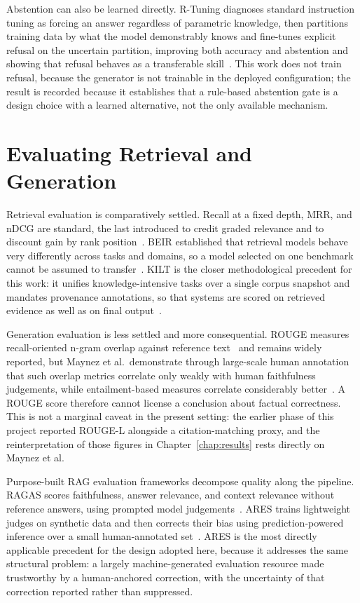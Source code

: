 Abstention can also be learned directly. R-Tuning diagnoses standard instruction tuning as forcing an answer regardless of parametric knowledge, then partitions training data by what the model demonstrably knows and fine-tunes explicit refusal on the uncertain partition, improving both accuracy and abstention and showing that refusal behaves as a transferable skill~\cite{zhang2024rtuning}. This work does not train refusal, because the generator is not trainable in the deployed configuration; the result is recorded because it establishes that a rule-based abstention gate is a design choice with a learned alternative, not the only available mechanism.

\section{Evaluating Retrieval and Generation}
\label{sec:sota-eval}

Retrieval evaluation is comparatively settled. Recall at a fixed depth, \ac{MRR}, and \ac{nDCG} are standard, the last introduced to credit graded relevance and to discount gain by rank position~\cite{jarvelin2002cumulated}. BEIR established that retrieval models behave very differently across tasks and domains, so a model selected on one benchmark cannot be assumed to transfer~\cite{thakur2021beir}. KILT is the closer methodological precedent for this work: it unifies knowledge-intensive tasks over a single corpus snapshot and mandates provenance annotations, so that systems are scored on retrieved evidence as well as on final output~\cite{petroni2021kilt}.

Generation evaluation is less settled and more consequential. ROUGE measures recall-oriented n-gram overlap against reference text~\cite{lin2004rouge} and remains widely reported, but Maynez et al.\ demonstrate through large-scale human annotation that such overlap metrics correlate only weakly with human faithfulness judgements, while entailment-based measures correlate considerably better~\cite{maynez2020faithfulness}. A ROUGE score therefore cannot license a conclusion about factual correctness. This is not a marginal caveat in the present setting: the earlier phase of this project reported ROUGE-L alongside a citation-matching proxy, and the reinterpretation of those figures in Chapter~\ref{chap:results} rests directly on Maynez et al.

Purpose-built \ac{RAG} evaluation frameworks decompose quality along the pipeline. RAGAS scores faithfulness, answer relevance, and context relevance without reference answers, using prompted model judgements~\cite{es2024ragas}. ARES trains lightweight judges on synthetic data and then corrects their bias using prediction-powered inference over a small human-annotated set~\cite{saadfalcon2024ares}. ARES is the most directly applicable precedent for the design adopted here, because it addresses the same structural problem: a largely machine-generated evaluation resource made trustworthy by a human-anchored correction, with the uncertainty of that correction reported rather than suppressed.

